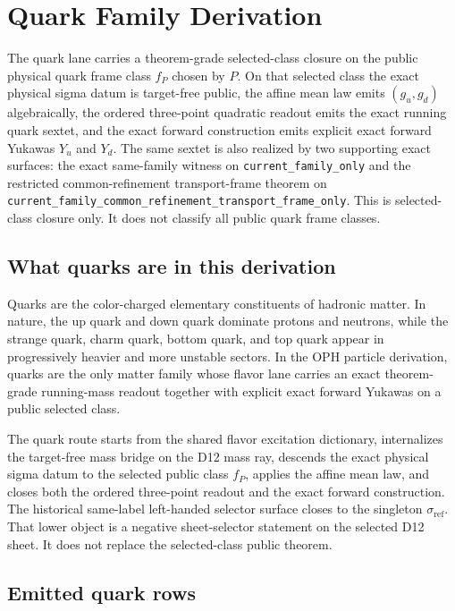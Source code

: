 \documentclass[11pt]{article}
\begin{document}
\section{Quark Family Derivation}

The quark lane carries a theorem-grade selected-class closure on the public physical quark frame
class \(f_P\) chosen by \(P\). On that selected class the exact physical sigma datum is
target-free public, the affine mean law emits \((g_u,g_d)\) algebraically, the ordered
three-point quadratic readout emits the exact running quark sextet, and the exact forward
construction emits explicit exact forward Yukawas \(Y_u\) and \(Y_d\). The same sextet is also
realized by two supporting exact surfaces: the exact same-family witness on
\texttt{current\_family\_only} and the restricted common-refinement
transport-frame theorem on
\texttt{current\_family\_common\_refinement\_transport\_frame\_only}. This is selected-class
closure only. It does not classify all public quark frame classes.

\subsection{What quarks are in this derivation}

Quarks are the color-charged elementary constituents of hadronic matter. In nature, the up quark
and down quark dominate protons and neutrons, while the strange quark, charm quark, bottom
quark, and top quark appear in progressively heavier and more unstable sectors. In the OPH
particle derivation, quarks are the only matter family whose flavor lane carries an exact
theorem-grade running-mass readout together with explicit exact forward Yukawas on a public
selected class.

The quark route starts from the shared flavor excitation dictionary, internalizes the target-free
mass bridge on the D12 mass ray, descends the exact physical sigma datum to the selected public
class \(f_P\), applies the affine mean law, and closes both the ordered three-point readout and
the exact forward construction. The historical same-label left-handed selector surface closes to
the singleton \(\sigma_{\mathrm{ref}}\). That lower object is a negative sheet-selector statement
on the selected D12 sheet. It does not replace the selected-class public theorem.

\subsection{Emitted quark rows}
\end{document}
